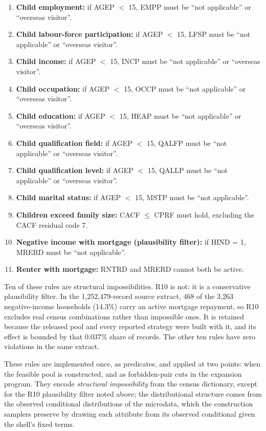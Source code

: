 \documentclass[review]{elsarticle}
\begin{document}
\begin{enumerate}[label=\textbf{R\arabic*}, ref=R\arabic*, leftmargin=*]
    \item \textbf{Child employment:} if AGEP $<$ 15, EMPP must be ``not applicable'' or ``overseas visitor''.
    \item \textbf{Child labour-force participation:} if AGEP $<$ 15, LFSP must be ``not applicable'' or ``overseas visitor''.
    \item \textbf{Child income:} if AGEP $<$ 15, INCP must be ``not applicable'' or ``overseas visitor''.
    \item \textbf{Child occupation:} if AGEP $<$ 15, OCCP must be ``not applicable'' or ``overseas visitor''.
    \item \textbf{Child education:} if AGEP $<$ 15, HEAP must be ``not applicable'' or ``overseas visitor''.
    \item \textbf{Child qualification field:} if AGEP $<$ 15, QALFP must be ``not applicable'' or ``overseas visitor''.
    \item \textbf{Child qualification level:} if AGEP $<$ 15, QALLP must be ``not applicable'' or ``overseas visitor''.
    \item \textbf{Child marital status:} if AGEP $<$ 15, MSTP must be ``not applicable''.
    \item \textbf{Children exceed family size:} CACF $\le$ CPRF must hold, excluding the CACF residual code 7.
    \item \textbf{Negative income with mortgage (plausibility filter):} if HIND = 1, MRERD must be ``not applicable''.
    \item \textbf{Renter with mortgage:} RNTRD and MRERD cannot both be active.
\end{enumerate}

Ten of these rules are structural impossibilities. R10 is not: it is a
conservative plausibility filter. In the 1{,}252{,}479-record source extract,
468 of the 3{,}263 negative-income households (14.3\%) carry an active mortgage
repayment, so R10 excludes real census combinations rather than impossible
ones. It is retained because the released pool and every reported strategy were
built with it, and its effect is bounded by that 0.037\% share of records. The
other ten rules have zero violations in the same extract.

These rules are implemented once, as predicates, and applied at two points: when the feasible pool is constructed, and as forbidden-pair cuts in the expansion program. They encode \emph{structural impossibility} from the census dictionary, except for the R10 plausibility filter noted above; the distributional structure comes from the observed conditional distributions of the microdata, which the construction samplers preserve by drawing each attribute from its observed conditional given the shell's fixed terms.
\end{document}
